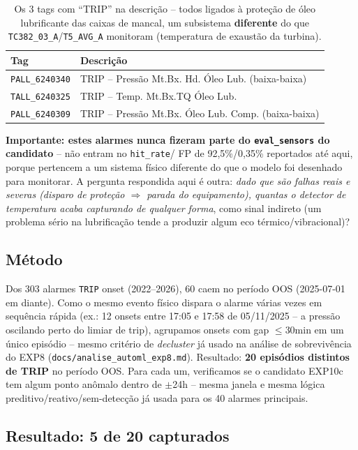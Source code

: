 \documentclass[11pt,a4paper]{article}
\begin{document}
\begin{table}[H]
\centering
\small
\begin{tabular}{@{}lp{7.5cm}@{}}
\toprule
\textbf{Tag} & \textbf{Descrição} \\
\midrule
\texttt{PALL\_6240340} & TRIP -- Pressão Mt.Bx. Hd. Óleo Lub. (baixa-baixa) \\
\texttt{TALL\_6240325} & TRIP -- Temp. Mt.Bx.TQ Óleo Lub. \\
\texttt{PALL\_6240309} & TRIP -- Pressão Mt.Bx. Óleo Lub. Comp. (baixa-baixa) \\
\bottomrule
\end{tabular}
\caption{Os 3 tags com ``TRIP'' na descrição -- todos ligados à proteção de
óleo lubrificante das caixas de mancal, um subsistema \textbf{diferente}
do que \texttt{TC382\_03\_A}/\texttt{T5\_AVG\_A} monitoram (temperatura de
exaustão da turbina).}
\end{table}

\textbf{Importante: estes alarmes nunca fizeram parte do
\texttt{eval\_sensors} do candidato} -- não entram no \texttt{hit\_rate}/
FP de 92,5\%/0,35\% reportados até aqui, porque pertencem a um sistema
físico diferente do que o modelo foi desenhado para monitorar. A pergunta
respondida aqui é outra: \emph{dado que são falhas reais e severas
(disparo de proteção $\Rightarrow$ parada do equipamento), quantas o
detector de temperatura acaba capturando de qualquer forma}, como sinal
indireto (um problema sério na lubrificação tende a produzir algum eco
térmico/vibracional)?

\subsection*{Método}

Dos 303 alarmes \texttt{TRIP} onset (2022--2026), 60 caem no período OOS
(2025-07-01 em diante). Como o mesmo evento físico dispara o alarme várias
vezes em sequência rápida (ex.: 12 onsets entre 17:05 e 17:58 de
05/11/2025 -- a pressão oscilando perto do limiar de trip), agrupamos
onsets com gap $\leq$30min em um único episódio -- mesmo critério de
\emph{decluster} já usado na análise de sobrevivência do EXP8
(\texttt{docs/analise\_automl\_exp8.md}). Resultado: \textbf{20 episódios
distintos de TRIP} no período OOS. Para cada um, verificamos se o
candidato EXP10c tem algum ponto anômalo dentro de $\pm$24h -- mesma
janela e mesma lógica preditivo/reativo/sem-detecção já usada para os 40
alarmes principais.

\subsection*{Resultado: 5 de 20 capturados}
\end{document}
